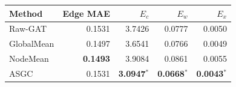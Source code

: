 \begin{tabular}{lrrrr}
\toprule
Method & Edge MAE & $E_c$ & $E_w$ & $E_x$\\
\midrule
Raw-GAT & 0.1531 & 3.7426 & 0.0777 & 0.0050\\
GlobalMean & 0.1497 & 3.6541 & 0.0766 & 0.0049\\
NodeMean & \textbf{0.1493} & 3.9084 & 0.0861 & 0.0055\\
ASGC & 0.1531 & \textbf{3.0947}$^*$ & \textbf{0.0668}$^*$ & \textbf{0.0043}$^*$\\
\bottomrule
\end{tabular}
